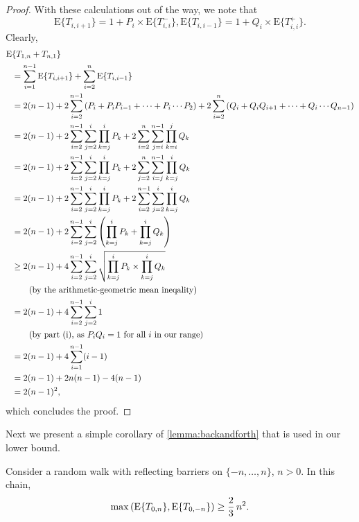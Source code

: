 \documentclass [letterpaper] {patmorin}
\newcommand{\EXP}{\mathrm{E}}
\begin{document}
\begin{proof}
With these calculations out of the way,  we note that
\[
\EXP \{ T_{i,i+1} \} = 1 + P_i \times \EXP \{ T^-_{i, i} \},
\EXP \{ T_{i,i-1} \} = 1 + Q_i \times \EXP \{ T^+_{i, i} \}.
\]
Clearly,
\[
\begin{aligned}
\EXP &\{  T_{1,n} + T_{n,1} \} \\
&= \sum_{i=1}^{n-1} \EXP \{ T_{i,i+1} \} + \sum_{i=2}^n \EXP \{ T_{i,i-1} \} \\
&= 2(n-1) + 2\sum_{i=2}^{n-1} \left( P_i + P_i P_{i-1} + \cdots + P_i \cdots P_{2} \right) + 2\sum_{i=2}^n \left( Q_i + Q_i Q_{i+1} + \cdots + Q_i \cdots Q_{n-1} \right) \\
&= 2(n-1) + 2\sum_{i=2}^{n-1} \sum_{j=2}^i \prod_{k=j}^i P_k + 2\sum_{i=2}^n \sum_{j=i}^{n-1} \prod_{k=i}^j Q_k  \\
&= 2(n-1) + 2\sum_{i=2}^{n-1} \sum_{j=2}^i \prod_{k=j}^i P_k + 2\sum_{j=2}^n \sum_{i=j}^{n-1} \prod_{k=j}^i Q_k  \\
&= 2(n-1) + 2\sum_{i=2}^{n-1} \sum_{j=2}^i \prod_{k=j}^i P_k + 2\sum_{i=2}^{n-1} \sum_{j=2}^i \prod_{k=j}^i Q_k  \\
&= 2(n-1) + 2\sum_{i=2}^{n-1} \sum_{j=2}^i \left( \prod_{k=j}^i P_k + \prod_{k=j}^i Q_k \right)  \\
&\ge 2(n-1) + 4\sum_{i=2}^{n-1} \sum_{j=2}^i \sqrt{ \prod_{k=j}^i P_k \times \prod_{k=j}^i Q_k } \\
&\qquad \hbox{\rm (by the arithmetic-geometric mean ineqality)} \\
&= 2(n-1) + 4\sum_{i=2}^{n-1} \sum_{j=2}^i  1 \\
&\qquad \hbox{\rm (by part (i), as $P_iQ_i = 1$ for all $i$ in our range)} \\
&= 2(n-1) + 4\sum_{i=1}^{n-1} (i-1) \\
&= 2(n-1) + 2 n (n-1) - 4 (n-1) \\
&= 2(n-1)^2,\\
\end{aligned}
\]
which concludes the proof.
\end{proof}

Next we present a simple corollary of \ref{lemma:backandforth} that is used in our lower bound.

\begin{cor}
Consider a random walk with reflecting barriers on $\{ -n, \ldots, n \}$,
$n > 0$. In this chain,
\[
\max \left( \EXP \{ T_{0,n} \} , \EXP \{ T_{0,-n} \} \right)
 \ge  {2 \over 3} \, n^2.
\]
\end{cor}
\end{document}
